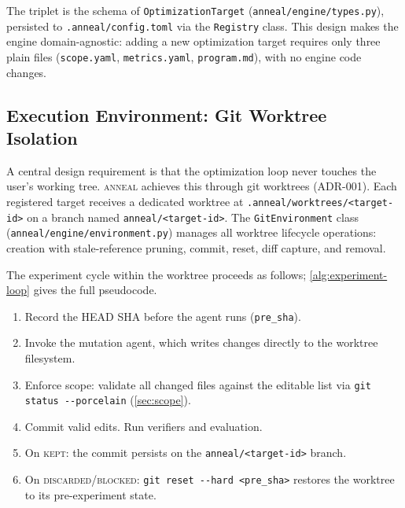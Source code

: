 The triplet is the schema of \texttt{Optimization\allowbreak{}Target} (\texttt{anneal/\allowbreak{}engine/\allowbreak{}types.py}), persisted to \texttt{.anneal/\allowbreak{}config.toml} via the \texttt{Registry} class.
This design makes the engine domain-agnostic: adding a new optimization target requires only three plain files (\texttt{scope.yaml}, \texttt{metrics.yaml}, \texttt{program.md}), with no engine code changes.

\subsection{Execution Environment: Git Worktree Isolation}\label{sec:worktree}

A central design requirement is that the optimization loop never touches the user's working tree.
\textsc{anneal} achieves this through git worktrees (ADR-001).
Each registered target receives a dedicated worktree at \texttt{.anneal/worktrees/<target-id>} on a branch named \texttt{anneal/<target-id>}.
The \texttt{GitEnvironment} class (\texttt{anneal/engine/environment.py}) manages all worktree lifecycle operations: creation with stale-reference pruning, commit, reset, diff capture, and removal.

The experiment cycle within the worktree proceeds as follows; \cref{alg:experiment-loop} gives the full pseudocode.

\begin{enumerate}
    \item Record the HEAD SHA before the agent runs (\texttt{pre\_sha}).
    \item Invoke the mutation agent, which writes changes directly to the worktree filesystem.
    \item Enforce scope: validate all changed files against the editable list via \texttt{git status -{}-porcelain} (\cref{sec:scope}).
    \item Commit valid edits. Run verifiers and evaluation.
    \item On \textsc{kept}: the commit persists on the \texttt{anneal/<target-id>} branch.
    \item On \textsc{discarded}/\textsc{blocked}: \texttt{git reset -{}-hard <pre\_sha>} restores the worktree to its pre-experiment state.
\end{enumerate}

